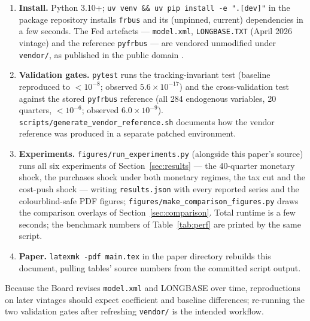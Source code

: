 \begin{enumerate}
  \item \textbf{Install.} Python 3.10+; \texttt{uv venv \&\& uv pip install -e ".[dev]"} in the package repository installs \texttt{frbus} and its (unpinned, current) dependencies in a few seconds. The Fed artefacts --- \texttt{model.xml}, \texttt{LONGBASE.TXT} (April 2026 vintage) and the reference \texttt{pyfrbus} --- are vendored unmodified under \texttt{vendor/}, as published in the public domain \citep{fedfrbuspython}.
  \item \textbf{Validation gates.} \texttt{pytest} runs the tracking-invariant test (baseline reproduced to $<10^{-8}$; observed $5.6\times10^{-17}$) and the cross-validation test against the stored \texttt{pyfrbus} reference (all 284 endogenous variables, 20 quarters, $<10^{-6}$; observed $6.0\times10^{-9}$). \texttt{scripts/generate\_vendor\_reference.sh} documents how the vendor reference was produced in a separate patched environment.
  \item \textbf{Experiments.} \texttt{figures/run\_experiments.py} (alongside this paper's source) runs all six experiments of Section~\ref{sec:results} --- the 40-quarter monetary shock, the purchases shock under both monetary regimes, the tax cut and the cost-push shock --- writing \texttt{results.json} with every reported series and the colourblind-safe PDF figures; \texttt{figures/make\_comparison\_figures.py} draws the comparison overlays of Section~\ref{sec:comparison}. Total runtime is a few seconds; the benchmark numbers of Table~\ref{tab:perf} are printed by the same script.
  \item \textbf{Paper.} \texttt{latexmk -pdf main.tex} in the paper directory rebuilds this document, pulling tables' source numbers from the committed script output.
\end{enumerate}

Because the Board revises \texttt{model.xml} and LONGBASE over time, reproductions on later vintages should expect coefficient and baseline differences; re-running the two validation gates after refreshing \texttt{vendor/} is the intended workflow.
